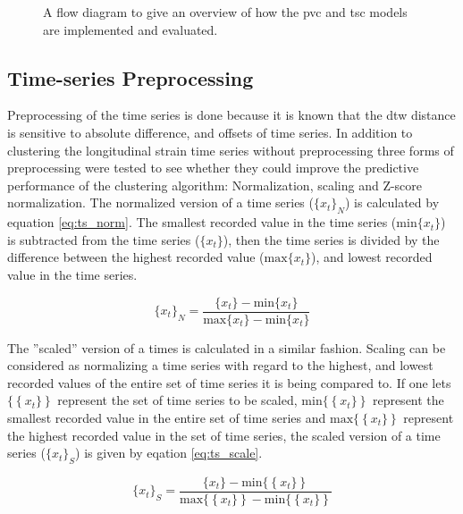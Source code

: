 \begin{figure}
    \centering
    
    \caption{A flow diagram to give an overview of how the \acrshort{pvc} and \acrshort{tsc} models are implemented and evaluated.}
    \label{fig:clust_flow}
\end{figure}

\clearpage

\subsection{Time-series Preprocessing}
Preprocessing of the time series is done because it is known that the \acrshort{dtw} distance is sensitive to absolute difference, and offsets of time series. In addition to clustering the longitudinal strain time series without preprocessing three forms of preprocessing were tested to see whether they could improve the predictive performance of the clustering algorithm: Normalization, scaling and Z-score normalization. The normalized version of a time series ($\{x_t\}_N$) is calculated by equation \eqref{eq:ts_norm}. The smallest recorded value in the time series ($\mathrm{min}\{x_t\}$) is subtracted from the time series ($\{x_t\}$), then the time series is divided by the difference between the highest recorded value ($\mathrm{max}\{x_t\}$), and lowest recorded value in the time series.

\begin{equation}
    \{x_t\}_N = \frac{\{x_t\} - \mathrm{min}\{x_t\}}{\mathrm{max}\{x_t\} - \mathrm{min}\{x_t\}}
    \label{eq:ts_norm}
\end{equation}

The ''scaled'' version of a times is calculated in a similar fashion. Scaling can be considered as normalizing a time series with regard to the highest, and lowest recorded values of the entire set of time series it is being compared to. If one lets $\{ \left \{ x_t \} \right \}$ represent the set of time series to be scaled, $\mathrm{min}\{ \left \{ x_t \} \right \}$ represent the smallest recorded value in the entire set of time series and $\mathrm{max}\{ \left \{ x_t \} \right \}$ represent the highest recorded value in the set of time series, the scaled version of a time series ($\{x_t\}_S$) is given by eqation \eqref{eq:ts_scale}.

\begin{equation}
    \{x_t\}_S = \frac{\{x_t\} - \mathrm{min}\{ \left \{ x_t \} \right \}}{\mathrm{max}\{ \left \{ x_t \} \right \} - \mathrm{min}\{ \left \{ x_t \} \right \}}
    \label{eq:ts_scale}
\end{equation}

